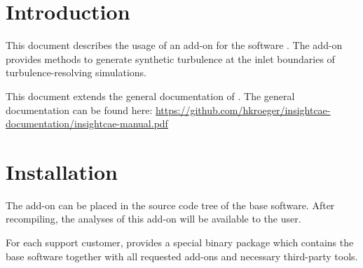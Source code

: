 \documentclass{sd_report}
\begin{document}
\section{Introduction}
This document describes the usage of an add-on for the software \is.
The add-on provides methods to generate synthetic turbulence at the inlet boundaries of turbulence-resolving simulations.

This document extends the general documentation of \is.
The general documentation can be found here:
\url{https://github.com/hkroeger/insightcae-documentation/insightcae-manual.pdf}


\section{Installation}
The add-on can be placed in the source code tree of the \is base software.
After recompiling, the analyses of this add-on will be available to the user.

For each support customer, \sd provides a special binary package which contains the \is base software together with all requested add-ons and necessary third-party tools.
\end{document}
